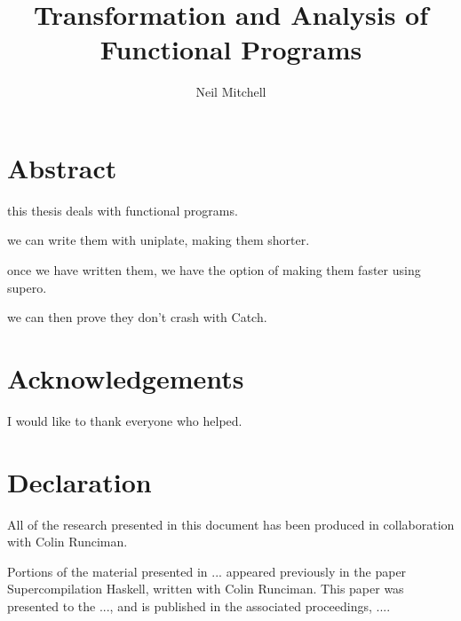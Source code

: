 
\author{Neil Mitchell}
\title{Transformation and Analysis of Functional Programs}

\maketitle

\chapter*{Abstract}
this thesis deals with functional programs.

we can write them with uniplate, making them shorter.

once we have written them, we have the option of making them faster using supero.

we can then prove they don't crash with Catch.


\tableofcontents

\listoffigures

\chapter*{Acknowledgements}

I would like to thank everyone who helped.

\chapter*{Declaration}

All of the research presented in this document has been produced in collaboration with Colin Runciman.

Portions of the material presented in ... appeared previously in the paper Supercompilation Haskell, written with Colin Runciman. This paper was presented to the ..., and is published in the associated proceedings, ....

